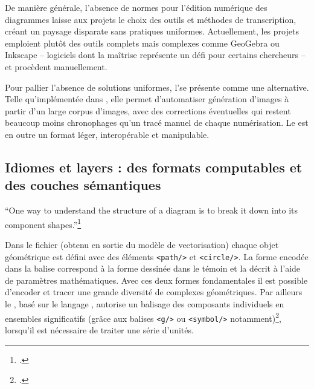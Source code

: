 De manière générale, l'absence de normes pour l'édition numérique des
diagrammes laisse aux projets le choix des outils et méthodes de
transcription, créant un paysage disparate sans pratiques uniformes.
Actuellement, les projets emploient plutôt des outils complets mais
complexes comme GeoGebra ou Inkscape -- logiciels dont la maîtrise
représente un défi pour certains chercheurs -- et procèdent
manuellement.

Pour pallier l'absence de solutions uniformes, l'\ia se présente comme une alternative. Telle qu'implémentée
dans \eida, elle permet d'automatiser génération d'images \svg à partir
d'un large corpus d'images, avec des corrections éventuelles qui restent
beaucoup moins chronophages qu'un tracé manuel de chaque numérisation.
Le \svg est en outre un format léger, interopérable et manipulable.

\hypertarget{idiomes-et-layers-des-formats-computables-et-des-couches-semantiques}{%
\subsection{Idiomes et layers : des formats computables et des
couches
sémantiques}\label{idiomes-et-layers-des-formats-computables-et-des-couches-semantiques}}

\begin{kwote}                            
``One way to understand the structure of a diagram is to break it down
into its component shapes.''\footcite[p.79]{roughan_digital_2014}
                            \end{kwote}  

Dans le fichier \svg (obtenu en sortie du modèle de vectorisation) chaque
objet géométrique est défini avec des éléments
\texttt{\textless{}path/\textgreater{}} et
\texttt{\textless{}circle/\textgreater{}}. La forme encodée dans la
balise correspond à la forme dessinée dans le témoin et la décrit à
l'aide de paramètres mathématiques. Avec ces deux formes fondamentales
il est possible d'encoder et tracer une grande diversité de complexes
géométriques. Par ailleurs le \svg, basé sur le langage \xml, autorise un
balisage des composants individuels en ensembles significatifs (grâce
aux balises \texttt{\textless{}g/\textgreater{}} ou
\texttt{\textless{}symbol/\textgreater{}} notamment)\footcite{noauthor_tutoriel_2024},
lorsqu'il est nécessaire de traiter une série d'unités.

